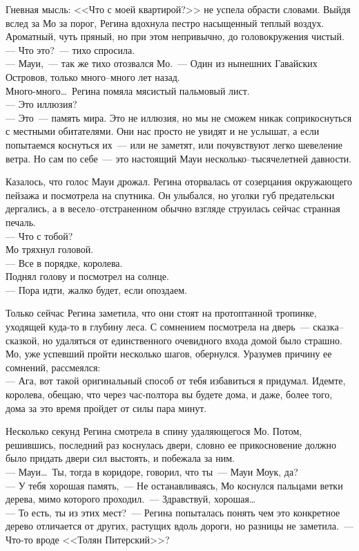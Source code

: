 Гневная мысль: <<Что с моей квартирой?>> не успела обрасти словами. Выйдя вслед 
за Мо за порог, Регина вдохнула пестро насыщенный теплый воздух. Ароматный, чуть 
пряный, но при этом непривычно, до головокружения чистый.\\
--- Что это?~--- тихо спросила.\\
--- Мауи,~--- так же тихо отозвался Мо.~--- Один из нынешних Гавайских Островов, 
только много--много лет назад.\\
Много-много\ldots\ Регина помяла мясистый пальмовый лист.\\
--- Это иллюзия?\\
--- Это~--- память мира. Это не иллюзия, но мы не сможем никак соприкоснуться с 
местными обитателями. Они нас просто не увидят и не услышат, а если попытаемся 
коснуться их~--- или не заметят, или почувствуют легко шевеление ветра. Но сам 
по себе~--- это настоящий Мауи несколько--тысячелетней давности.

Казалось, что голос Мауи дрожал. Регина оторвалась от созерцания окружающего 
пейзажа и посмотрела на спутника. Он улыбался, но уголки губ предательски 
дергались, а в весело--отстраненном обычно взгляде струилась сейчас странная 
печаль.\\
--- Что с тобой?\\
Мо тряхнул головой.\\
--- Все в порядке, королева.\\
Поднял голову и посмотрел на солнце.\\
--- Пора идти, жалко будет, если опоздаем.


Только сейчас Регина заметила, что они стоят на протоптанной тропинке, уходящей 
куда-то в глубину леса. С сомнением посмотрела на дверь~--- сказка--сказкой, но 
удаляться от единственного очевидного входа домой было страшно. Мо, уже 
успевший пройти несколько шагов, обернулся. Уразумев причину ее сомнений, рассмеялся:\\
--- Ага, вот такой оригинальный способ от тебя избавиться я придумал. Идемте, 
королева, обещаю, что через час-полтора вы будете дома, и даже, более того, 
дома за это время пройдет от силы пара минут.

Несколько секунд Регина смотрела в спину удаляющегося Мо. Потом, решившись, 
последний раз коснулась двери, словно ее прикосновение должно было придать 
двери сил выстоять, и побежала за ним.\\
--- Мауи\ldots\ Ты, тогда в коридоре, говорил, что ты~--- Мауи Моук, да?\\
--- У тебя хорошая память,~--- Не останавливаясь, Мо коснулся пальцами ветки 
дерева, мимо которого проходил.~--- Здравствуй, хорошая\ldots\\
--- То есть, ты из этих мест?~--- Регина попыталась понять чем это конкретное 
дерево отличается от других, растущих вдоль дороги, но разницы не заметила.~--- Что-то 
вроде <<Толян Питерский>>?

